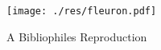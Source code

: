\begin{titlepage}
    \begin{addmargin}[-1cm]{-3cm}
    \begin{center}
        \large

        \hfill

        \vfill

        \begingroup
            \color{Maroon} \\ \bigskip
        \endgroup

         \\
        
        \vfill
        
        \texttt{[image: ./res/fleuron.pdf]}
        
        \vfill


        A Bibliophiles Reproduction \\ \medskip

        \myTime
        

        \vfill                      

    \end{center}  
  \end{addmargin}       
\end{titlepage}   